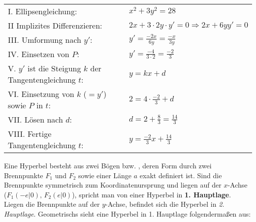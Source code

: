 { \renewcommand{\arraystretch}{2}

\begin{tabular}{l l}
	I. Ellipsengleichung: & $x^2 + 3y^2 = 28$
	\\
	II Implizites Differenzieren: & $2x + 3 \cdot{} 2y \cdot{} y' = 0 \Rightarrow 2x + 6yy' = 0$
	\\
	III. Umformung nach $y'$: & $y' = \frac{-2x}{6y} = \frac{-x}{3y}$
	\\
	IV. Einsetzen von $P$: & $y' = \frac{-4}{3 \cdot{} 2} = \frac{-2}{3}$
	\\
	V. $y'$ ist die Steigung $k$ der Tangentengleichung $t$: & $y = kx + d$
	\\
	VI. Einsetzung von $k$ ($ = y'$) sowie $P$ in $t$: & $2 = 4 \cdot \frac{-2}{3} + d$
	\\
	VII. L\"{o}sen nach $d$: & $d = 2 + \frac{8}{3} = \frac{14}{3}$
	\\
	VIII. Fertige Tangentengleichung $t$: & $y = \frac{-2}{3}x + \frac{14}{3}$
\end{tabular}

} %

\pagebreak


Eine Hyperbel besteht aus zwei B\"{o}gen bzw. , deren Form durch zwei Brennpunkte $F_{1}$ und $F_{2}$ sowie einer L\"{a}nge $a$ exakt definiert ist. Sind die Brennpunkte symmetrisch zum Koordinatenursprung und liegen auf der $x$-Achse ($F_{1} (-e | 0),\, F_{2} (e | 0)$), spricht man von einer Hyperbel in \textbf{1. Hauptlage}. Liegen die Brennpunkte auf der $y$-Achse, befindet sich die Hyperbel in \emph{2. Hauptlage}. Geometrischs sieht eine Hyperbel in 1. Hauptlage folgenderma\ss{}en aus:


